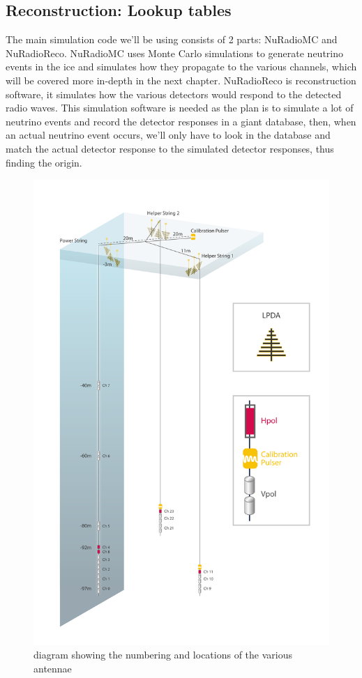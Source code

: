 \subsection{Reconstruction: Lookup tables}
The main simulation code we'll be using consists of 2 parts:
NuRadioMC\cite{Glaser_2020} and NuRadioReco\cite{Glaser_2019}. NuRadioMC uses
Monte Carlo simulations to generate neutrino events in the ice and simulates
how they propagate to the various channels, which will be covered more in-depth
in the next chapter. NuRadioReco is reconstruction software, it simulates how
the various detectors would respond to the detected radio waves. This simulation
software is needed as the plan is to simulate a lot of neutrino events and
record the detector responses in a giant database, then, when an actual neutrino
event occurs, we'll only have to look in the database and match the actual
detector response to the simulated detector responses, thus finding the origin.
\begin{figure}
	\centering
	\includegraphics[height=0.9\textheight]{figures/detector.pdf}	
	\caption{diagram showing the numbering and locations of the various antennae}
	\label{fig:detector}
\end{figure}
